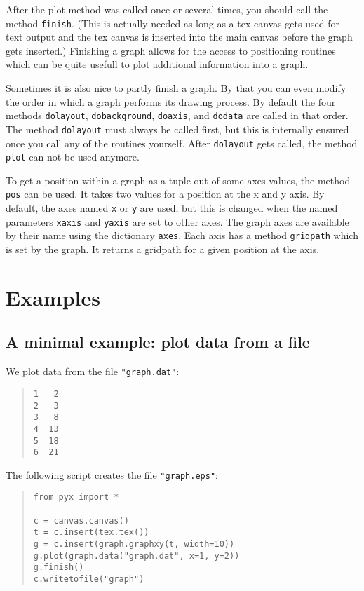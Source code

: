 After the plot method was called once or several times, you should
call the method \verb|finish|. (This is actually needed as long as a
tex canvas gets used for text output and the tex canvas is inserted
into the main canvas before the graph gets inserted.) Finishing a
graph allows for the access to positioning routines which can be quite
usefull to plot additional information into a graph.

Sometimes it is also nice to partly finish a graph. By that you can
even modify the order in which a graph performs its drawing process.
By default the four methods \verb|dolayout|, \verb|dobackground|,
\verb|doaxis|, and \verb|dodata| are called in that order. The method
\verb|dolayout| must always be called first, but this is internally
ensured once you call any of the routines yourself. After
\verb|dolayout| gets called, the method \verb|plot| can not be used
anymore.

To get a position within a graph as a tuple out of some axes values,
the method \verb|pos| can be used. It takes two values for a position
at the x and y axis. By default, the axes named \verb|x| or \verb|y|
are used, but this is changed when the named parameters \verb|xaxis|
and \verb|yaxis| are set to other axes. The graph axes are available
by their name using the dictionary \verb|axes|. Each axis has a method
\verb|gridpath| which is set by the graph. It returns a gridpath for a
given position at the axis.

\section{Examples}

\subsection{A minimal example: plot data from a file}

We plot data from the file \verb|"graph.dat"|:

\begin{quote}
\begin{verbatim}
1   2
2   3
3   8
4  13
5  18
6  21
\end{verbatim}
\end{quote}

The following script creates the file \verb|"graph.eps"|:

\begin{quote}
\begin{verbatim}
from pyx import *

c = canvas.canvas()
t = c.insert(tex.tex())
g = c.insert(graph.graphxy(t, width=10))
g.plot(graph.data("graph.dat", x=1, y=2))
g.finish()
c.writetofile("graph")
\end{verbatim}
\end{quote}

